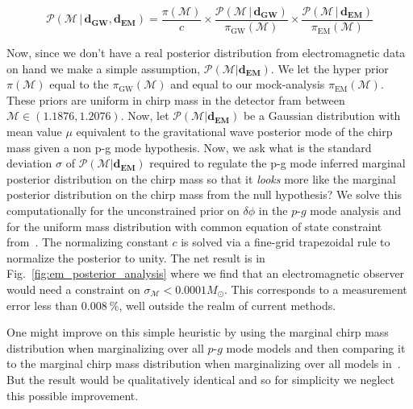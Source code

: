 \begin{equation}
    \mathcal{P}(\mathcal{M} \, |  \, \mathbf{d_{GW}}, \mathbf{d_{EM}}) = \frac{\pi(\mathcal{M})}{c} \times \frac{\mathcal{P}(\mathcal{M} \, | \, \mathbf{d_{GW}})}{\pi_{\mathrm{GW}}(\mathcal{M})} \times \frac{\mathcal{P}(\mathcal{M} \, | \, \mathbf{d_{EM}})}{\pi_{\mathrm{EM}}(\mathcal{M})}
\end{equation}

Now, since we don't have a real posterior distribution from electromagnetic data on hand we make a simple assumption, $\mathcal{P}(\mathcal{M} | \mathbf{d_{EM}})$. We let the hyper prior $\pi(\mathcal{M})$ equal to the $\pi_{\mathrm{GW}}(\mathcal{M})$ and equal to our mock-analysis $\pi_{\mathrm{EM}}(\mathcal{M})$. These priors are uniform in chirp mass in the detector fram between $\mathcal{M} \in (1.1876, 1.2076)$. Now, let $\mathcal{P}(\mathcal{M} | \mathbf{d_{EM}})$ be a Gaussian distribution with mean value $\mu$ equivalent to the gravitational wave posterior mode of the chirp mass given a non p-g mode hypothesis. Now, we ask what is the standard deviation $\sigma$ of $\mathcal{P}(\mathcal{M} | \mathbf{d_{EM}})$ required to regulate the p-g mode inferred marginal posterior distribution on the chirp mass so that it \textit{looks} more like the marginal posterior distribution on the chirp mass from the null hypothesis? We solve this computationally for the unconstrained prior on $\delta \phi$ in the $p$-$g$ mode analysis and for the uniform mass distribution with common equation of state constraint from~\cite{de2018tidal}. The normalizing constant $c$ is solved via a fine-grid trapezoidal rule to normalize the posterior to unity. The net result is in Fig.~\ref{fig:em_posterior_analysis} where we find that an electromagnetic observer would need a constraint on $\sigma_{\mathcal{M}} < 0.0001 M_{\odot}$. This corresponds to a measurement error less than $0.008~\%$, well outside the realm of current methods.

One might improve on this simple heuristic by using the marginal chirp mass distribution when marginalizing over all $p$-$g$ mode models and then comparing it to the marginal chirp mass distribution when marginalizing over all models in~\cite{de2018tidal}. But the result would be qualitatively identical and so for simplicity we neglect this possible improvement.

